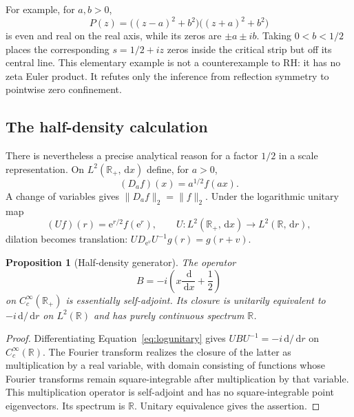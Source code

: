 \documentclass[11pt,letterpaper]{article}
\numberwithin{equation}{section}
\newtheorem{proposition}[theorem]{Proposition}
\theoremstyle{definition}
\theoremstyle{remark}
\newcommand{\R}{\mathbb R}
\newcommand{\dd}{\,\mathrm d}
\newcommand{\e}{\mathrm e}
\begin{document}
For example, for $a,b>0$,
\begin{equation}
 P(z)=\bigl((z-a)^2+b^2\bigr)\bigl((z+a)^2+b^2\bigr)
 \label{eq:quartet}
\end{equation}
is even and real on the real axis, while its zeros are $\pm a\pm ib$. Taking $0<b<1/2$ places the corresponding $s=1/2+iz$ zeros inside the critical strip but off its central line. This elementary example is not a counterexample to RH: it has no zeta Euler product. It refutes only the inference from reflection symmetry to pointwise zero confinement.

\subsection{The half-density calculation}
There is nevertheless a precise analytical reason for a factor $1/2$ in a scale representation. On $L^2(\R_+,\dd x)$ define, for $a>0$,
\begin{equation}
 (D_af)(x)=a^{1/2}f(ax).
 \label{eq:dilation}
\end{equation}
A change of variables gives $\|D_af\|_2=\|f\|_2$. Under the logarithmic unitary map
\begin{equation}
 (Uf)(r)=\e^{r/2}f(\e^r),\qquad
 U:L^2(\R_+,\dd x)\longrightarrow L^2(\R,\dd r),
 \label{eq:logunitary}
\end{equation}
dilation becomes translation: $UD_{\e^v}U^{-1}g(r)=g(r+v)$.

\begin{proposition}[Half-density generator]
\label{prop:half}
The operator
\begin{equation}
 B=-i\left(x\frac{\dd}{\dd x}+\frac12\right)
 \label{eq:dilationgenerator}
\end{equation}
on $C_c^\infty(\R_+)$ is essentially self-adjoint. Its closure is unitarily equivalent to $-i\dd/\dd r$ on $L^2(\R)$ and has purely continuous spectrum $\R$.
\end{proposition}
\begin{proof}
Differentiating Equation~\eqref{eq:logunitary} gives $UBU^{-1}=-i\dd/\dd r$ on $C_c^\infty(\R)$. The Fourier transform realizes the closure of the latter as multiplication by a real variable, with domain consisting of functions whose Fourier transforms remain square-integrable after multiplication by that variable. This multiplication operator is self-adjoint and has no square-integrable point eigenvectors. Its spectrum is $\R$. Unitary equivalence gives the assertion.
\end{proof}
\end{document}
